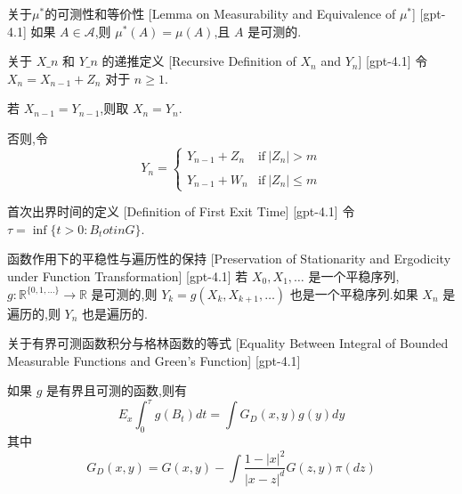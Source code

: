 \documentclass[UTF8]{ctexart}
\begin{document}
    
    
    \begin{lma}
        {关于$\mu^*$的可测性和等价性}
        [Lemma on Measurability and Equivalence of $\mu^*$]
        [gpt-4.1]
        如果 $A \in \mathcal{A}$,则 $\mu^*(A) = \mu(A)$,且 $A$ 是可测的.
    \end{lma}
    
    
    
    \begin{dfn}
        {关于 $X\_n$ 和 $Y\_n$ 的递推定义}
        [Recursive Definition of $X_n$ and $Y_n$]
        [gpt-4.1]
        令 $X_{n} = X_{n-1} + Z_{n}$ 对于 $n \geq 1$.

若 $X_{n-1} = Y_{n-1}$,则取 $X_{n} = Y_{n}$.

否则,令
\[
Y_{n} = \left\{
  \begin{array}{ll}
    Y_{n-1} + Z_{n} & \mathrm{if}\ |Z_{n}| > m \\
    \\
    Y_{n-1} + W_{n} & \mathrm{if}\ |Z_{n}| \leq m
  \end{array}
\right.
\]

    \end{dfn}
    
    
    
    \begin{dfn}
        {首次出界时间的定义}
        [Definition of First Exit Time]
        [gpt-4.1]
        令 $\tau = \operatorname*{inf} \{ t > 0 : B_{t} 
otin G \}$.
    \end{dfn}
    
    
    
    \begin{thm}
        {函数作用下的平稳性与遍历性的保持}
        [Preservation of Stationarity and Ergodicity under Function Transformation]
        [gpt-4.1]
        若 $X_0, X_1, \ldots$ 是一个平稳序列,$g : \mathbb{R}^{\{0,1,\ldots\}} \to \mathbb{R}$ 是可测的,则 $Y_k = g(X_k, X_{k+1}, \ldots)$ 也是一个平稳序列.如果 $X_n$ 是遍历的,则 $Y_n$ 也是遍历的.
    \end{thm}
    
    
    
    \begin{thm}
        {关于有界可测函数积分与格林函数的等式}
        [Equality Between Integral of Bounded Measurable Functions and Green's Function]
        [gpt-4.1]
        
如果 $g$ 是有界且可测的函数,则有
\[
E_x \int_0^{\tau} g(B_t) dt = \int G_D(x, y) g(y) dy
\]
其中
\[
G_D(x, y) = G(x, y) - \int \frac{1 - |x|^2}{|x - z|^d} G(z, y) \pi(dz)
\]

    \end{thm}
    
\end{document}
